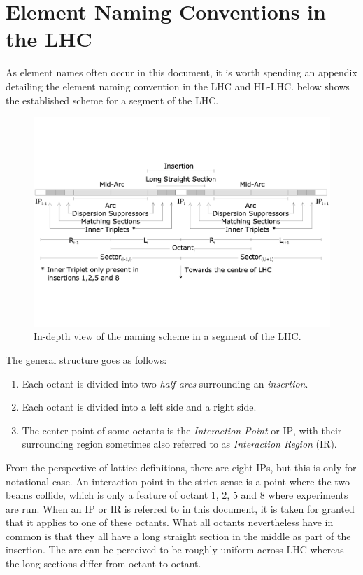 \chapter{Element Naming Conventions in the LHC}
\label{appendix:naming_conventions}


As element names often occur in this document, it is worth spending an appendix detailing the element naming convention in the LHC and HL-LHC.
 below shows the established scheme for a segment of the LHC.

\begin{figure}[h]
    \centering
    \includegraphics*[width=0.9\linewidth]{Figures/Appendices/LHC_naming_scheme.pdf}
    \caption{In-depth view of the naming scheme in a segment of the LHC.}
    \label{figure:lhc_segment_naming_scheme}
  \end{figure}

The general structure goes as follows:
\begin{enumerate}
    \item Each octant is divided into two \textit{half-arcs} surrounding an \textit{insertion}.
    \item Each octant is divided into a left side and a right side.
    \item The center point of some octants is the \textit{Interaction Point} or $\mathrm{IP}$, with their surrounding region sometimes also referred to as \textit{Interaction Region} ($\mathrm{IR}$).
\end{enumerate}

From the perspective of lattice definitions, there are eight $\mathrm{IP}$s, but this is only for notational ease.
An interaction point in the strict sense is a point where the two beams collide, which is only a feature of octant 1, 2, 5 and 8 where experiments are run.
When an $\mathrm{IP}$ or $\mathrm{IR}$ is referred to in this document, it is taken for granted that it applies to one of these octants.
What all octants nevertheless have in common is that they all have a long straight section in the middle as part of the insertion.
The arc can be perceived to be roughly uniform across LHC whereas the long sections differ from octant to octant.


